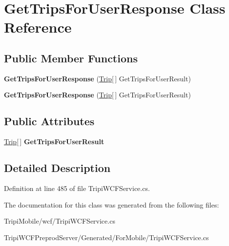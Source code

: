 \hypertarget{class_get_trips_for_user_response}{
\section{GetTripsForUserResponse Class Reference}
\label{class_get_trips_for_user_response}
}
\subsection*{Public Member Functions}
\begin{DoxyCompactItemize}
\item 
\hypertarget{class_get_trips_for_user_response_a4ff426717f77a2305a35ba8482822a6a}{
{\bfseries GetTripsForUserResponse} (\hyperlink{class_trip}{Trip}\mbox{[}$\,$\mbox{]} GetTripsForUserResult)}
\label{class_get_trips_for_user_response_a4ff426717f77a2305a35ba8482822a6a}

\item 
\hypertarget{class_get_trips_for_user_response_a4ff426717f77a2305a35ba8482822a6a}{
{\bfseries GetTripsForUserResponse} (\hyperlink{class_trip}{Trip}\mbox{[}$\,$\mbox{]} GetTripsForUserResult)}
\label{class_get_trips_for_user_response_a4ff426717f77a2305a35ba8482822a6a}

\end{DoxyCompactItemize}
\subsection*{Public Attributes}
\begin{DoxyCompactItemize}
\item 
\hypertarget{class_get_trips_for_user_response_aa9ec5d7497d5771f17fe6e28a761b692}{
\hyperlink{class_trip}{Trip}\mbox{[}$\,$\mbox{]} {\bfseries GetTripsForUserResult}}
\label{class_get_trips_for_user_response_aa9ec5d7497d5771f17fe6e28a761b692}

\end{DoxyCompactItemize}


\subsection{Detailed Description}


Definition at line 485 of file TripiWCFService.cs.

The documentation for this class was generated from the following files:\begin{DoxyCompactItemize}
\item 
TripiMobile/wcf/TripiWCFService.cs\item 
TripiWCFPreprodServer/Generated/ForMobile/TripiWCFService.cs\end{DoxyCompactItemize}
